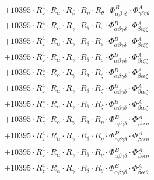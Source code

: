 \documentclass{article}
\begin{document}
\begin{subequations}
\begin{gather}
\begin{array}{c}
 \\[0.2em] 		 + 10395 \cdot R_{z}^{4} \cdot R_{\alpha{}} \cdot R_{\beta{}} \cdot R_{\eta{}} \cdot R_{\theta{}} \cdot \Phi{}^{B}_{\alpha{}\beta{}\gamma{}\delta{}} \cdot \Phi{}^{A}_{\gamma{}\delta{}\eta{}\theta{}} 
 \\[0.2em] 		 + 10395 \cdot R_{z}^{4} \cdot R_{\alpha{}} \cdot R_{\gamma{}} \cdot R_{\delta{}} \cdot R_{\epsilon{}} \cdot \Phi{}^{B}_{\alpha{}\beta{}\gamma{}\delta{}} \cdot \Phi{}^{A}_{\beta{}\epsilon{}\zeta{}\zeta{}} 
 \\[0.2em] 		 + 10395 \cdot R_{z}^{4} \cdot R_{\alpha{}} \cdot R_{\gamma{}} \cdot R_{\delta{}} \cdot R_{\epsilon{}} \cdot \Phi{}^{B}_{\alpha{}\beta{}\gamma{}\delta{}} \cdot \Phi{}^{A}_{\beta{}\epsilon{}\zeta{}\zeta{}} 
 \\[0.2em] 		 + 10395 \cdot R_{z}^{4} \cdot R_{\alpha{}} \cdot R_{\gamma{}} \cdot R_{\delta{}} \cdot R_{\epsilon{}} \cdot \Phi{}^{B}_{\alpha{}\beta{}\gamma{}\delta{}} \cdot \Phi{}^{A}_{\beta{}\epsilon{}\zeta{}\zeta{}} 
 \\[0.2em] 		 + 10395 \cdot R_{z}^{4} \cdot R_{\alpha{}} \cdot R_{\gamma{}} \cdot R_{\delta{}} \cdot R_{\zeta{}} \cdot \Phi{}^{B}_{\alpha{}\beta{}\gamma{}\delta{}} \cdot \Phi{}^{A}_{\beta{}\epsilon{}\epsilon{}\zeta{}} 
 \\[0.2em] 		 + 10395 \cdot R_{z}^{4} \cdot R_{\alpha{}} \cdot R_{\gamma{}} \cdot R_{\delta{}} \cdot R_{\zeta{}} \cdot \Phi{}^{B}_{\alpha{}\beta{}\gamma{}\delta{}} \cdot \Phi{}^{A}_{\beta{}\epsilon{}\epsilon{}\zeta{}} 
 \\[0.2em] 		 + 10395 \cdot R_{z}^{4} \cdot R_{\alpha{}} \cdot R_{\gamma{}} \cdot R_{\delta{}} \cdot R_{\zeta{}} \cdot \Phi{}^{B}_{\alpha{}\beta{}\gamma{}\delta{}} \cdot \Phi{}^{A}_{\beta{}\epsilon{}\epsilon{}\zeta{}} 
 \\[0.2em] 		 + 10395 \cdot R_{z}^{4} \cdot R_{\alpha{}} \cdot R_{\gamma{}} \cdot R_{\delta{}} \cdot R_{\eta{}} \cdot \Phi{}^{B}_{\alpha{}\beta{}\gamma{}\delta{}} \cdot \Phi{}^{A}_{\beta{}\epsilon{}\epsilon{}\eta{}} 
 \\[0.2em] 		 + 10395 \cdot R_{z}^{4} \cdot R_{\alpha{}} \cdot R_{\gamma{}} \cdot R_{\delta{}} \cdot R_{\eta{}} \cdot \Phi{}^{B}_{\alpha{}\beta{}\gamma{}\delta{}} \cdot \Phi{}^{A}_{\beta{}\epsilon{}\epsilon{}\eta{}} 
 \\[0.2em] 		 + 10395 \cdot R_{z}^{4} \cdot R_{\alpha{}} \cdot R_{\gamma{}} \cdot R_{\delta{}} \cdot R_{\eta{}} \cdot \Phi{}^{B}_{\alpha{}\beta{}\gamma{}\delta{}} \cdot \Phi{}^{A}_{\beta{}\epsilon{}\epsilon{}\eta{}} 
 \\[0.2em] 		 + 10395 \cdot R_{z}^{4} \cdot R_{\alpha{}} \cdot R_{\gamma{}} \cdot R_{\delta{}} \cdot R_{\theta{}} \cdot \Phi{}^{B}_{\alpha{}\beta{}\gamma{}\delta{}} \cdot \Phi{}^{A}_{\beta{}\epsilon{}\epsilon{}\theta{}} 

\end{array}
\end{gather}
\end{subequations}
\end{document}
